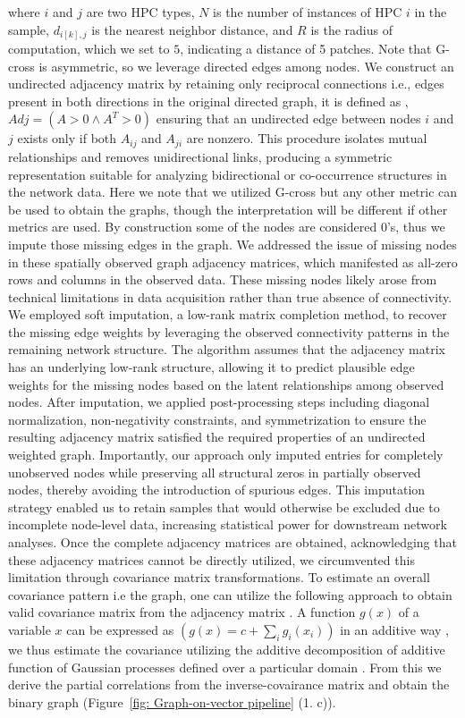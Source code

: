 \documentclass[pdflatex,article,12pt]{article}
\begin{document}
where $i$ and $j$ are two HPC types, $N$ is the number of instances of HPC $i$ in the sample, $d_{i[k],j}$ is the nearest neighbor distance, and $R$ is the radius of computation, which we set to $5$, indicating a distance of 5 patches. Note that G-cross is asymmetric, so we leverage directed edges among nodes. We construct an undirected adjacency matrix by retaining only reciprocal connections i.e., edges present in both directions in the original directed graph, it is defined as , $Adj = (A>0 \land A^T>0 )$ ensuring that an undirected edge between nodes  $i$ and $j$ exists only if both $A_{ij}$ and $A_{ji}$ are nonzero. This procedure isolates mutual relationships and removes unidirectional links, producing a symmetric representation suitable for analyzing bidirectional or co-occurrence structures in the network data. Here we note that we utilized G-cross but any other metric can be used to obtain the graphs, though the interpretation will be different if other metrics are used. By construction some of the nodes are considered 0's, thus we impute those missing edges in the graph. We addressed the issue of missing nodes in these spatially observed graph adjacency matrices, which manifested as all-zero rows and columns in the observed data. These missing nodes likely arose from technical limitations in data acquisition rather than true absence of connectivity. We employed soft imputation, a low-rank matrix completion method, to recover the missing edge weights by leveraging the observed connectivity patterns in the remaining network structure. The algorithm assumes that the adjacency matrix has an underlying low-rank structure, allowing it to predict plausible edge weights for the missing nodes based on the latent relationships among observed nodes. After imputation, we applied post-processing steps including diagonal normalization, non-negativity constraints, and symmetrization to ensure the resulting adjacency matrix satisfied the required properties of an undirected weighted graph. Importantly, our approach only imputed entries for completely unobserved nodes while preserving all structural zeros in partially observed nodes, thereby avoiding the introduction of spurious edges. This imputation strategy enabled us to retain samples that would otherwise be excluded due to incomplete node-level data, increasing statistical power for downstream network analyses. Once the complete adjacency matrices are obtained, acknowledging that these adjacency matrices cannot be directly utilized, we circumvented this limitation through covariance matrix transformations. To estimate an overall covariance pattern i.e the graph, one can utilize the following approach to obtain valid covariance matrix from the adjacency matrix \cite{rasmussen_gaussian_2008}. A function $g(x)$ of a variable $x$ can be expressed as $(g(x)=c+\sum_{i} g_i(x_i))$ in an additive way \cite{hastie_exploring_1990}, we thus estimate the covariance utilizing the additive decomposition of additive function of Gaussian processes defined over a particular domain \cite{bishop_pattern_2006}. From this we derive the partial correlations from the inverse-covairance matrix and obtain the binary graph (Figure~\ref{fig: Graph-on-vector pipeline} (1. c)). 
\end{document}
